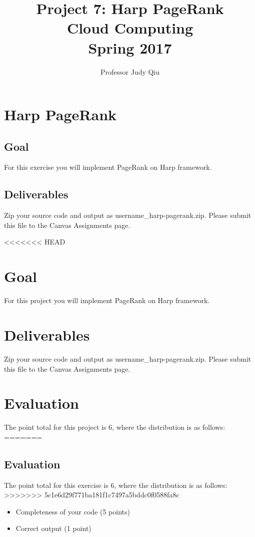 \section*{Harp PageRank}
\subsection*{Goal}
For this exercise you will implement PageRank on Harp framework.

\subsection*{Deliverables}
Zip your source code and output as username\_harp-pagerank.zip. Please submit
this file to the Canvas Assignments page.

<<<<<<< HEAD


\title{Project 7: Harp PageRank\\ Cloud Computing\\ Spring 2017}         %
\author{Professor Judy Qiu }        %
\date{}
\maketitle
\makeatother     %
\pagestyle{plain}
\section*{Goal}
For this project you will implement PageRank on Harp\cite{Harp} framework.

\section*{Deliverables}
Zip your source code and output as username\_harp-pagerank.zip. Please submit this file to the Canvas Assignments page.

\section*{Evaluation}
The point total for this project is 6, where the distribution is as follows:
=======
\subsection*{Evaluation}
The point total for this exercise is 6, where the distribution is as follows:
>>>>>>> 5c1e6d29f771ba181f1c7497a5bddc0f0588fa8c
\begin{itemize}
\item Completeness of your code (5 points)
\item Correct output (1 point)
\end{itemize}

